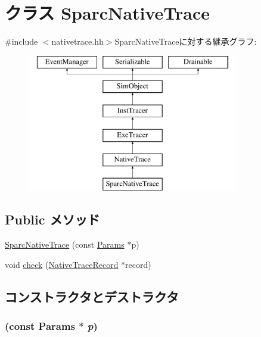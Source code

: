 \hypertarget{classTrace_1_1SparcNativeTrace}{
\section{クラス SparcNativeTrace}
\label{classTrace_1_1SparcNativeTrace}
}


{\ttfamily \#include $<$nativetrace.hh$>$}SparcNativeTraceに対する継承グラフ:\begin{figure}[H]
\begin{center}
\leavevmode
\includegraphics[height=6cm]{classTrace_1_1SparcNativeTrace}
\end{center}
\end{figure}
\subsection*{Public メソッド}
\begin{DoxyCompactItemize}
\item 
\hyperlink{classTrace_1_1SparcNativeTrace_ac3c0f8a99d00d21a4a82dbffa8fe0ebb}{SparcNativeTrace} (const \hyperlink{classTrace_1_1ExeTracer_a6680098765037131737b022c9fa9252e}{Params} $\ast$p)
\item 
void \hyperlink{classTrace_1_1SparcNativeTrace_a826e1279dfa7dd9ce6760a2e6efe4116}{check} (\hyperlink{classTrace_1_1NativeTraceRecord}{NativeTraceRecord} $\ast$record)
\end{DoxyCompactItemize}


\subsection{コンストラクタとデストラクタ}
\hypertarget{classTrace_1_1SparcNativeTrace_ac3c0f8a99d00d21a4a82dbffa8fe0ebb}{
\subsubsection[{SparcNativeTrace}]{ (const {\bf Params} $\ast$ {\em p})}}
\label{classTrace_1_1SparcNativeTrace_ac3c0f8a99d00d21a4a82dbffa8fe0ebb}



